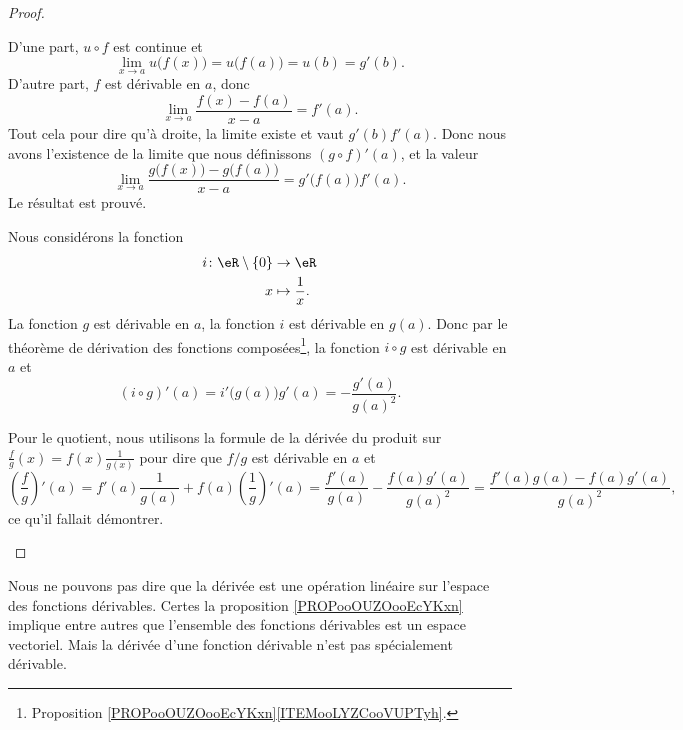 \begin{proof}
\begin{subproof}
		D'une part, \( u\circ f\) est continue et
		\begin{equation}
			\lim_{x\to a} u\big( f(x) \big)=u\big( f(a) \big)=u(b)=g'(b).
		\end{equation}
		D'autre part, \( f\) est dérivable en \( a\), donc
		\begin{equation}
			\lim_{x\to a} \frac{ f(x)-f(a) }{ x-a }=f'(a).
		\end{equation}
		Tout cela pour dire qu'à droite, la limite existe et vaut \( g'(b)f'(a)\). Donc nous avons l'existence de la limite que nous définissons \( (g\circ f)'(a)\), et la valeur
		\begin{equation}
			\lim_{x\to a} \frac{ g\big( f(x) \big)-g\big( f(a) \big) }{ x-a }= g'\big( f(a) \big)f'(a).
		\end{equation}
		Le résultat est prouvé.

		Nous considérons la fonction
		\begin{equation}
			\begin{aligned}
				i\colon \eR\setminus\{ 0 \} & \to \eR                \\
				x                           & \mapsto \frac{1}{ x }.
			\end{aligned}
		\end{equation}
		La fonction \( g\) est dérivable en \( a\), la fonction \( i\) est dérivable en \( g(a)\). Donc par le théorème de dérivation des fonctions composées\footnote{Proposition \ref{PROPooOUZOooEcYKxn}\ref{ITEMooLYZCooVUPTyh}.}, la fonction \( i\circ g\) est dérivable en \( a\) et
		\begin{equation}
			(i\circ g)'(a)=i'\big( g(a) \big)g'(a)=-\frac{ g'(a) }{ g(a)^2 }.
		\end{equation}

		Pour le quotient, nous utilisons la formule de la dérivée du produit sur \( \frac{ f }{ g }(x)=f(x)\frac{1}{ g(x) } \) pour dire que \( f/g\) est dérivable en \( a\) et
		\begin{equation}
			\left( \frac{ f }{ g } \right)'(a)=f'(a)\frac{1}{ g(a) }+f(a)\left( \frac{1}{ g } \right)'(a)
			=\frac{ f'(a) }{ g(a) }-\frac{ f(a)g'(a) }{ g(a)^2 }
			=\frac{ f'(a)g(a)-f(a)g'(a) }{ g(a)^2 },
		\end{equation}
		ce qu'il fallait démontrer.
	\end{subproof}
\end{proof}

\begin{remark}
	Nous ne pouvons pas dire que la dérivée est une opération linéaire sur l'espace des fonctions dérivables. Certes la proposition \ref{PROPooOUZOooEcYKxn} implique entre autres que l'ensemble des fonctions dérivables est un espace vectoriel. Mais la dérivée d'une fonction dérivable n'est pas spécialement dérivable.
\end{remark}


